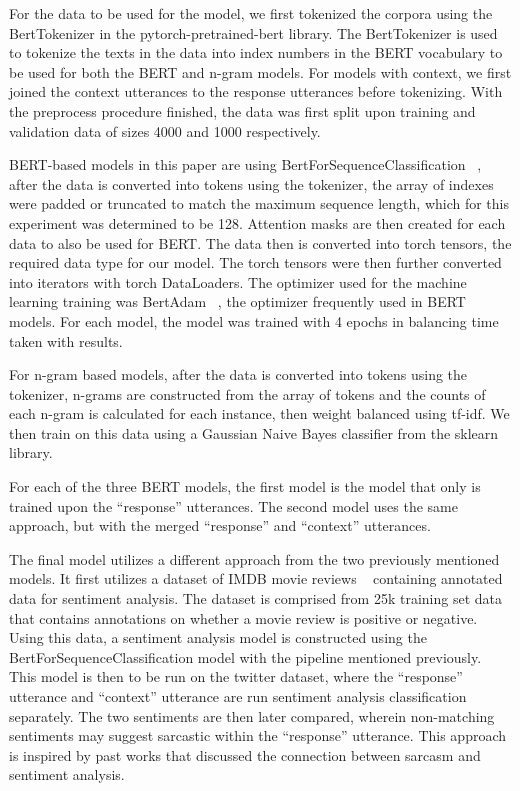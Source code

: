 \documentclass[11pt,a4paper]{article}
\begin{document}
For the data to be used for the model, we first tokenized the corpora using the BertTokenizer in the pytorch-pretrained-bert library. The BertTokenizer is used to tokenize the
texts in the data into index numbers in the BERT vocabulary to be used for both the BERT and n-gram models. For models with context, we first joined the context utterances to the
response utterances before tokenizing. With the preprocess procedure finished, the data was first split upon training and validation data of sizes 4000 and 1000 respectively.

BERT-based models in this paper are using BertForSequenceClassification ~\cite{devlin-etal-2019-bert}, after the data is converted into tokens using the tokenizer, the array of indexes were padded or truncated to match the maximum sequence length, which for
this experiment was determined to be 128. Attention masks are then created for each data to also be used for BERT. 
The data then is converted into torch tensors, the required data type for our model. The torch tensors were then further converted into iterators with torch DataLoaders. The
optimizer used for the machine learning training was BertAdam ~\cite{devlin-etal-2019-bert}, the optimizer frequently used in BERT models. For each model, the model was trained
with 4 epochs in balancing time taken with results. 

For n-gram based models, after the data is converted into tokens using the tokenizer, n-grams are constructed from the array of tokens and the counts of each n-gram is calculated
for each instance, then weight balanced using tf-idf. We then train on this data using a Gaussian Naive Bayes classifier from the sklearn library.

For each of the three BERT models, the first model is the model that only is trained upon the “response” utterances. The second model uses the same approach, but with the merged “response” and “context” utterances.

The final model utilizes a different approach from the two previously mentioned models. It first utilizes a dataset of IMDB movie reviews ~\cite{maas-EtAl:2011:ACL-HLT2011}
containing annotated data for sentiment analysis. The dataset is comprised from 25k training set data that contains annotations on whether a movie review is positive or negative.
Using this data, a sentiment analysis model is constructed using the BertForSequenceClassification model with the pipeline mentioned previously. This model is then to be run on the
twitter dataset, where the “response” utterance and “context” utterance are run sentiment analysis classification separately. The two sentiments are then later compared, wherein
non-matching sentiments may suggest sarcastic within the “response” utterance. This approach is inspired by past works that discussed the connection between sarcasm and sentiment
analysis. ~\cite{Veale10detectingironic}
\end{document}
